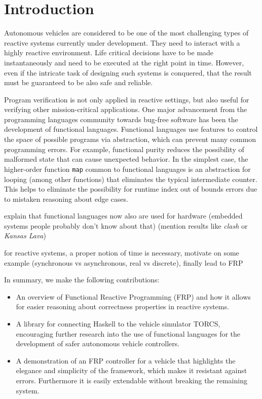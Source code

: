 \section{Introduction}

Autonomous vehicles are considered to be one of the most challenging
types of reactive systems currently under development. They need to
interact with a highly reactive environment. Life critical decisions
have to be made instantaneously and need to be executed at the right
point in time. However, even if the intricate task of designing such
systems is conquered, that the result must be guaranteed to be also safe and reliable.

Program verification is not only applied in reactive settings, but also useful for verifying other mission-critical applications.
One major advancement from the programming languages community towards bug-free software has been the development of functional languages.
Functional languages use features to control the space of possible programs via abstraction, which can prevent many common programming errors.
For example, functional purity reduces the possibility of malformed state that can cause unexpected behavior.
In the simplest case, the higher-order function \texttt{map} common to functional languages is an abstraction for looping (among other functions) that eliminates the typical intermediate counter.
This helps to eliminate the possibility for runtime index out of bounds errors due to mistaken reasoning about edge cases.



explain that functional languages now also are used for hardware
  (embedded systems people probably don't know about that) (mention
  results like \emph{clash} or \emph{Kansas Lava})


for reactive systems, a proper notion of time is necessary,
  motivate on some example (synchronous vs asynchronous, real vs
  discrete), finally lead to FRP




In summary, we make the following contributions:

\begin{itemize}
\item An overview of Functional Reactive Programming (FRP) and how it allows for easier reasoning about correctness properties in reactive systems. 

\item A library for connecting Haskell to the vehicle simulator TORCS, encouraging further research into the use of functional languages for the development of safer autonomous vehicle controllers.

\item A demonstration of an FRP controller for a vehicle that highlights the elegance and simplicity of the framework,
   which makes it resistant against errors. Furthermore it is easily extendable without breaking the remaining system.

\end{itemize}

